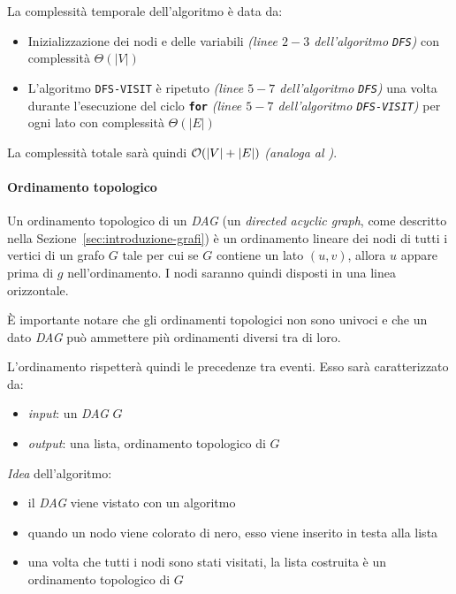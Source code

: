 \documentclass[italian, 10pt]{article}
\begin{document}
La complessità temporale dell'algoritmo è data da:

\begin{itemize}
  \item Inizializzazione dei nodi e delle variabili \textit{(linee \(2-3\) dell'algoritmo \texttt{DFS})} con complessità \(\Theta(|V|)\)
  \item L'algoritmo \texttt{DFS-VISIT} è ripetuto \textit{(linee \(5-7\) dell'algoritmo \texttt{DFS})} una volta durante l'esecuzione del ciclo \textbf{\texttt{for}} \textit{(linee \(5-7\) dell'algoritmo \texttt{DFS-VISIT})} per ogni lato con complessità \(\Theta(|E|)\)
\end{itemize}

La complessità totale sarà quindi \(\mathcal{O}(|V|+|E|)\) \textit{(analoga al \BFS)}.

\paragraph{Ordinamento topologico}

Un ordinamento topologico di un \textit{DAG} (un \textit{directed acyclic graph}, come descritto nella Sezione~\ref{sec:introduzione-grafi}) è un ordinamento lineare dei nodi di tutti i vertici di un grafo \(G\) tale per cui se \(G\) contiene un lato \((u, v)\), allora \(u\) appare prima di \(g\) nell'ordinamento.
I nodi saranno quindi disposti in una linea orizzontale.

È importante notare che gli ordinamenti topologici non sono univoci e che un dato \textit{DAG} può ammettere più ordinamenti diversi tra di loro.

L'ordinamento rispetterà quindi le precedenze tra eventi.
Esso sarà caratterizzato da:

\begin{itemize}
  \item \textit{input}: un \textit{DAG} \(G\)
  \item \textit{output}: una lista, ordinamento topologico di \(G\)
\end{itemize}

\textit{Idea} dell'algoritmo:

\begin{itemize}
  \item il \textit{DAG} viene vistato con un algoritmo \DFS
  \item quando un nodo viene colorato di nero, esso viene inserito in testa alla lista
  \item una volta che tutti i nodi sono stati visitati, la lista costruita è un ordinamento topologico di \(G\)
\end{itemize}
\end{document}
